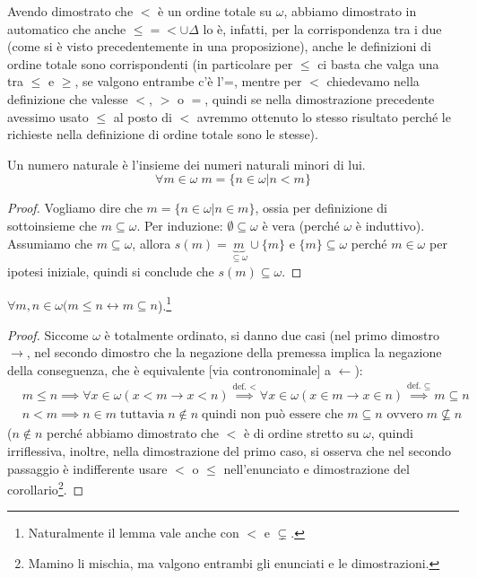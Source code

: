 \begin{remark}
	Avendo dimostrato che $<$ è un ordine totale su $\omega$, abbiamo dimostrato in automatico che anche $\leq = < \cup \Delta$ lo è, infatti, per la corrispondenza tra i due (come si è visto precedentemente in una proposizione), anche le definizioni di ordine totale sono corrispondenti (in particolare per 
	$\leq$ ci basta che valga una tra $\leq$ e $\geq$, se valgono entrambe c'è l'=, mentre per $<$ chiedevamo nella definizione che valesse $<$, $>$ o $=$, quindi se nella dimostrazione precedente avessimo usato $\leq$ al posto di $<$ avremmo ottenuto lo stesso risultato perché le richieste nella definizione di ordine totale sono le stesse).
\end{remark}

\begin{corollary}
	Un numero naturale è l'insieme dei numeri naturali minori di lui.
	\[ \forall m \in \omega \; m = \{n \in \omega | n < m\}
		\]
\end{corollary}

\begin{proof}
	Vogliamo dire che $m = \{ n \in \omega | n \in m\}$, ossia per definizione di sottoinsieme che $m \subseteq \omega$. Per induzione: $\emptyset \subseteq \omega$ è vera (perché $\omega$ è induttivo).
	Assumiamo che $m \subseteq \omega$, allora $s(m) = \underbrace{m}_{\subseteq \omega} \cup \{m\}$ e $\{m\} \subseteq \omega$ perché $m \in \omega$ per ipotesi iniziale, quindi si conclude che $s(m) \subseteq \omega$.
\end{proof}

\begin{corollary}[Più piccolo = contenuto]
	$\forall m,n \in \omega (m \leq n \leftrightarrow m \subseteq n$).\footnote{Naturalmente il lemma vale anche con $<$ e $\subsetneq$.}
\end{corollary}

\begin{proof}
	Siccome $\omega$ è totalmente ordinato, si danno due casi (nel primo dimostro $\rightarrow$, nel secondo dimostro che la negazione della premessa implica la negazione della conseguenza, che è equivalente [via contronominale] a $\leftarrow$):
	\begin{align*}
		& m \leq n \implies \forall x \in \omega (x < m \rightarrow x < n) \overset{\text{def. $<$}}{\implies} \forall x \in \omega (x \in m \rightarrow x \in n) \overset{\text{def. $\subseteq$}}{\implies} m \subseteq n \\
	    & n < m \implies n \in m \; \text{tuttavia} \; n \not\in n \; \text{quindi non può essere che $m \subseteq n$ ovvero} \; m \not\subseteq n
	\end{align*}
	($n \not \in n$ perché abbiamo dimostrato che $<$ è di ordine stretto su $\omega$, quindi irriflessiva, inoltre, nella dimostrazione del primo caso, si osserva che nel secondo passaggio è
	indifferente usare $<$ o $\leq$ nell'enunciato e dimostrazione del corollario\footnote{Mamino li mischia, ma valgono entrambi gli enunciati e le dimostrazioni.}.
\end{proof}
\pagebreak
